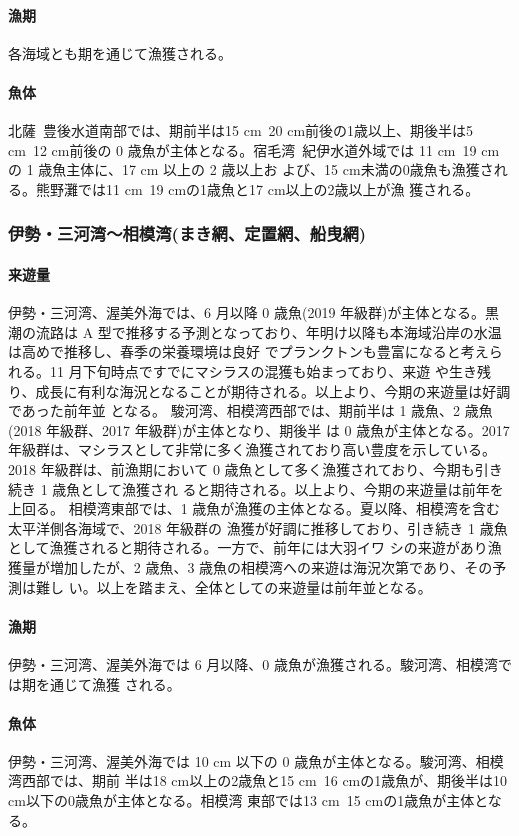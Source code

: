 \documentclass[11pt]{article}
\begin{document}
\paragraph{漁期}
各海域とも期を通じて漁獲される。
\paragraph{魚体}
北薩~豊後水道南部では、期前半は15 cm~20 cm前後の1歳以上、期後半は5 cm~12 cm前後の
0 歳魚が主体となる。宿毛湾~紀伊水道外域では 11 cm~19 cm の 1 歳魚主体に、17 cm 以上の 2 歳以上お よび、15 cm未満の0歳魚も漁獲される。熊野灘では11 cm~19 cmの1歳魚と17 cm以上の2歳以上が漁 獲される。



\subsubsection{伊勢・三河湾〜相模湾(まき網、定置網、船曳網)}
\paragraph{来遊量}
伊勢・三河湾、渥美外海では、6 月以降 0 歳魚(2019 年級群)が主体となる。黒潮の流路は A 型で推移する予測となっており、年明け以降も本海域沿岸の水温は高めで推移し、春季の栄養環境は良好 でプランクトンも豊富になると考えられる。11 月下旬時点ですでにマシラスの混獲も始まっており、来遊 や生き残り、成長に有利な海況となることが期待される。以上より、今期の来遊量は好調であった前年並 となる。
駿河湾、相模湾西部では、期前半は 1 歳魚、2 歳魚(2018 年級群、2017 年級群)が主体となり、期後半 は 0 歳魚が主体となる。2017 年級群は、マシラスとして非常に多く漁獲されており高い豊度を示している。 2018 年級群は、前漁期において 0 歳魚として多く漁獲されており、今期も引き続き 1 歳魚として漁獲され ると期待される。以上より、今期の来遊量は前年を上回る。
相模湾東部では、1 歳魚が漁獲の主体となる。夏以降、相模湾を含む太平洋側各海域で、2018 年級群の 漁獲が好調に推移しており、引き続き 1 歳魚として漁獲されると期待される。一方で、前年には大羽イワ シの来遊があり漁獲量が増加したが、2 歳魚、3 歳魚の相模湾への来遊は海況次第であり、その予測は難し い。以上を踏まえ、全体としての来遊量は前年並となる。
\paragraph{漁期}
伊勢・三河湾、渥美外海では 6 月以降、0 歳魚が漁獲される。駿河湾、相模湾では期を通じて漁獲 される。
\paragraph{魚体}
伊勢・三河湾、渥美外海では 10 cm 以下の 0 歳魚が主体となる。駿河湾、相模湾西部では、期前 半は18 cm以上の2歳魚と15 cm~16 cmの1歳魚が、期後半は10 cm以下の0歳魚が主体となる。相模湾 東部では13 cm~15 cmの1歳魚が主体となる。
\end{document}
